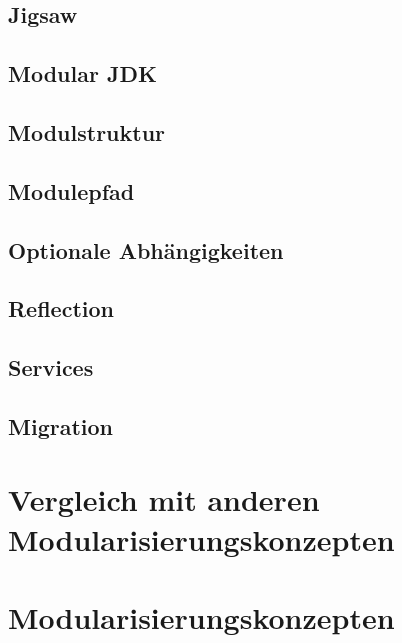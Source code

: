 \subsection{Jigsaw}
\subsection{Modular JDK}
\subsection{Modulstruktur}
\subsection{Modulepfad}
\subsection{Optionale Abhängigkeiten}
\subsection{Reflection}
\subsection{Services} 
\subsection{Migration}

\section{Vergleich mit anderen Modularisierungskonzepten}


\section{Modularisierungskonzepten}

\subsection{}

